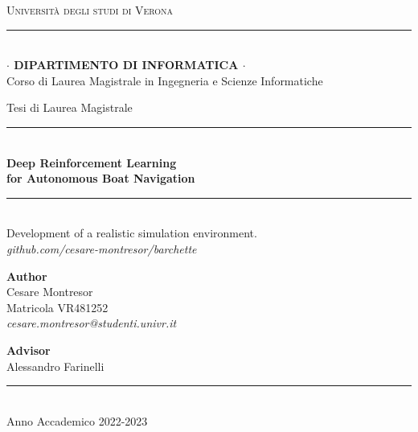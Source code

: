 
\begin{titlepage}


\begin{center}
{{\Large{\textsc{ Universit\`a degli studi di Verona }}}} 
\rule{15.8cm}{0.1mm}\\
{\small 
    {\bf $\cdot$ DIPARTIMENTO DI INFORMATICA $\cdot$ } \\
    Corso di Laurea Magistrale in Ingegneria e Scienze Informatiche\\
}
\end{center}


\vspace{12mm}


\begin{center}
Tesi di Laurea Magistrale
\end{center}


\vspace{12mm}


\begin{center}


\rule[0.0cm]{12.0cm}{0.05mm}\\
{\bf{}\LARGE
Deep Reinforcement Learning\\
for Autonomous Boat Navigation\\
}
\rule[0.0cm]{12.0cm}{0.05mm}\\
Development of a realistic simulation environment.\\
{\scriptsize\emph{github.com/cesare-montresor/barchette} }
\end{center}


\vspace{4cm}

\begin{center}
    \begin{minipage}[t]{0.40\textwidth}
    {\bf Author}\\
    Cesare Montresor\\
    Matricola VR481252\\ 
    \small{\emph{ cesare.montresor@studenti.univr.it}}\\
    \end{minipage}
    \hfill
    \begin{minipage}[t]{0.40\textwidth}\raggedleft
    {\bf Advisor}\\
    Alessandro Farinelli
    \end{minipage}
\end{center}

\vspace{3cm}


\begin{center}
    \rule{15.8cm}{0.1mm}\\
    {\textsc Anno Accademico 2022-2023}
\end{center}




\end{titlepage}

\newpage

\restoregeometry

\blankpage
